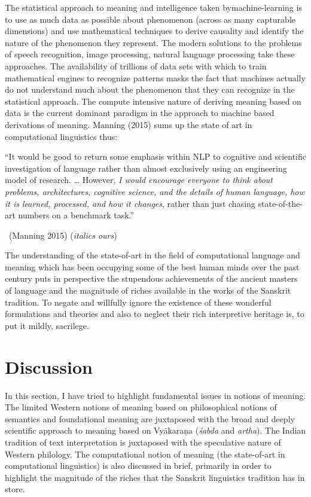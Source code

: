 The statistical approach to meaning and intelligence taken by\break machine-learning is to use as much data as possible about phenomenon (across as many capturable dimensions) and use mathematical techniques to derive causality and identify the nature of the phenomenon they represent. The modern solutions to the problems of speech recognition, image processing, natural language processing take these approaches. The availability of trillions of data sets with which to train mathematical engines to recognize patterns masks the fact that machines actually do not understand much about the phenomenon that they can recognize in the statistical approach. The compute intensive nature of deriving meaning based on data is the current dominant paradigm in the approach to machine based derivations of meaning. Manning (2015) sums up the state of art in computational linguistics thus:

\begin{myquote}
“It would be good to return some emphasis within NLP to cognitive and scientific investigation of language rather than almost exclusively using an engineering model of research. … However, \textit{I would encourage everyone to think about problems, architectures, cognitive science, and the details of human language, how it is learned, processed, and how it changes}, rather than just chasing state-of-the-art numbers on a benchmark task.”

~\hfill (Manning 2015) (\textit{italics ours})
\end{myquote}

The understanding of the state-of-art in the field of computational language and meaning which has been occupying some of the best human minds over the past century puts in perspective the stupendous achievements of the ancient masters of language and the magnitude of riches available in the works of the Sanskrit tradition. To negate and willfully ignore the existence of these wonderful formulations and theories and also to neglect their rich interpretive heritage is, to put it mildly, sacrilege.


\section*{Discussion}

\vskip -7pt

In this section, I have tried to highlight fundamental issues in notions of meaning. The limited Western notions of meaning based on philosophical notions of semantics and foundational meaning are juxtaposed with the broad and deeply scientific approach to meaning based on Vyākaraṇa (\textit{śabda} and \textit{artha}). The Indian tradition of text interpretation is juxtaposed with the speculative nature of Western philology. The computational notion of meaning (the state-of-art in computational linguistics) is also discussed in brief, primarily in order to highlight the magnitude of the riches that the Sanskrit linguistics tradition has in store.

